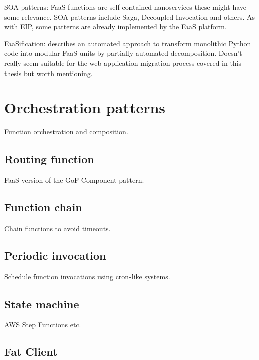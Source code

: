 SOA patterns: FaaS functions are self-contained nanoservices these might have some relevance. SOA patterns \parencite{rotem12soa} include Saga, Decoupled Invocation and others. As with EIP, some patterns are already implemented by the FaaS platform.

FaaSification: \textcite{spillner17transformpython} describes an automated approach to transform monolithic Python code into modular FaaS units by partially automated decomposition. Doesn't really seem suitable for the web application migration process covered in this thesis but worth mentioning.

\section{Orchestration patterns} \label{sec:orchestrationPatterns}

Function orchestration and composition.

\subsection{Routing function} \label{subsubsec:routingFunction}

FaaS version of the GoF Component pattern.

\subsection{Function chain} \label{subsubsec:functionChain}

Chain functions to avoid timeouts.

\subsection{Periodic invocation} \label{subsubsec:periodicInvocation}

Schedule function invocations using cron-like systems.

\subsection{State machine} \label{subsubsec:stateMachine}

AWS Step Functions etc.

\subsection{Fat Client} \label{subsubsec:fatClient}

